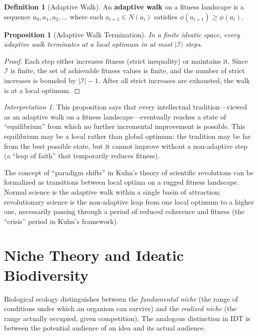 \documentclass[11pt,openany]{book}
\theoremstyle{definition}
\newtheorem{definition}[axiom]{Definition}
\theoremstyle{plain}
\newtheorem{proposition}[axiom]{Proposition}
\theoremstyle{remark}
\newtheorem{interpretation}[axiom]{Interpretation}
\newcommand{\IS}{\mathcal{I}}               %
\begin{document}
\begin{definition}[Adaptive Walk]
An \textbf{adaptive walk} on a fitness landscape is a sequence $a_0, a_1, a_2, \ldots$ where each $a_{i+1} \in N(a_i)$ satisfies $\phi(a_{i+1}) \geq \phi(a_i)$.
\end{definition}

\begin{proposition}[Adaptive Walk Termination]
In a finite ideatic space, every adaptive walk terminates at a local optimum in at most $|\IS|$ steps.
\end{proposition}

\begin{proof}
Each step either increases fitness (strict inequality) or maintains it. Since $\IS$ is finite, the set of achievable fitness values is finite, and the number of strict increases is bounded by $|\IS| - 1$. After all strict increases are exhausted, the walk is at a local optimum.
\end{proof}

\begin{interpretation}
This proposition says that every intellectual tradition---viewed as an adaptive walk on a fitness landscape---eventually reaches a state of ``equilibrium'' from which no further incremental improvement is possible. This equilibrium may be a local rather than global optimum: the tradition may be far from the best possible state, but it cannot improve without a non-adaptive step (a ``leap of faith'' that temporarily reduces fitness).

The concept of ``paradigm shifts'' in Kuhn's theory of scientific revolutions can be formalized as transitions between local optima on a rugged fitness landscape. Normal science is the adaptive walk within a single basin of attraction; revolutionary science is the non-adaptive leap from one local optimum to a higher one, necessarily passing through a period of reduced coherence and fitness (the ``crisis'' period in Kuhn's framework).
\end{interpretation}

\section{Niche Theory and Ideatic Biodiversity}

Biological ecology distinguishes between the \emph{fundamental niche} (the range of conditions under which an organism can survive) and the \emph{realized niche} (the range actually occupied, given competition). The analogous distinction in IDT is between the potential audience of an idea and its actual audience.
\end{document}
